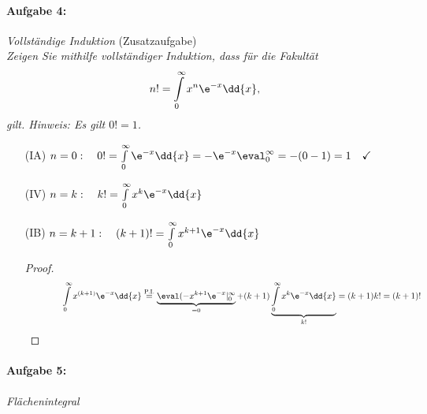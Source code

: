 \paragraph{Aufgabe 4: } \emph{Vollständige Induktion} \hfill (Zusatzaufgabe)\\[0.2cm]
\emph{Zeigen Sie mithilfe vollständiger Induktion, dass für die Fakultät}
\begin{align*}
    n! = \int\limits_{0}^{\infty} x^n \e^{-x} \dd{x},
\end{align*}
\emph{gilt. Hinweis: Es gilt $0! = 1$.}
\begin{enumerate}
    \setlength{\mathindent}{0cm}
    \item[(IA)] $n=0: \quad 0! = \int\limits_{0}^{\infty} \e^{-x} \dd{x} = -\e^{-x}\eval_0^\infty = -(0-1) = 1 \quad\checkmark$ 
    \item[(IV)] $n=k: \quad k! = \int\limits_{0}^{\infty} x^k \e^{-x} \dd{x}$
    \item[(IB)] $n=k+1: \quad (k+1)! = \int\limits_{0}^{\infty} x^{k+1} \e^{-x} \dd{x}$\\
    \begin{proof}$~$\\[-1.8cm]
        \begin{align}
            \hspace{1.5cm} \int\limits_{0}^{\infty} x^{(k+1)} \e^{-x} \dd{x} \overset{\text{P.I.}}{=} \underbrace{\eval(-x^{k+1} \e^{-x}|_0^\infty}_{=0} + (k+1) \underbrace{\int\limits_{0}^{\infty} x^k \e^{-x} \dd{x}}_{k!} = (k+1)k! = (k+1)!
        \end{align}
    \end{proof}
\end{enumerate}

\paragraph{Aufgabe 5: } \emph{Flächenintegral}\\[0.2cm]

